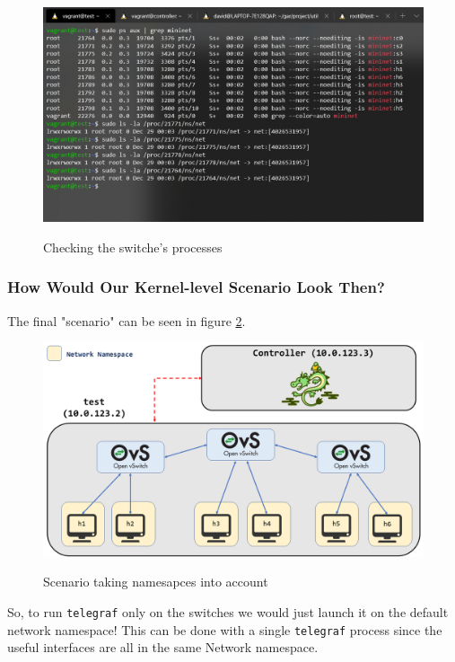 \documentclass[12pt]{article}
\begin{document}
		\begin{figure}[!htb]
			\centering
			\includegraphics[width=\linewidth]{switches_ln.png}
			\label{f:switches}
			\caption{Checking the switche's processes}
		\end{figure}

		\subsubsection{How Would Our Kernel-level Scenario Look Then?}

		The final "scenario" can be seen in figure \ref{f:scenario_kernel}.

		\begin{figure}[!htb]
			\centering
			\includegraphics[width=\linewidth]{scenario_kernel.png}
			\label{f:scenario_kernel}
			\caption{Scenario taking namesapces into account}
		\end{figure}

		So, to run \texttt{telegraf} only on the switches we would just launch it on the default network namespace! This can be done with a single \texttt{telegraf} process since the useful interfaces are all in the same Network namespace.
\end{document}
